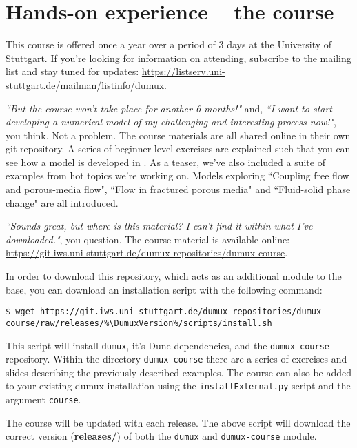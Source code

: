 \section{Hands-on \Dumux experience -- the \Dumux course}
This course is offered once a year over a period of 3 days at the University of Stuttgart.
If you're looking for information on attending, subscribe to the \Dumux mailing list
and stay tuned for updates:
\url{https://listserv.uni-stuttgart.de/mailman/listinfo/dumux}. \par
%
\textit{``But the course won't take place for another 6 months!"} and,
\textit{``I want to start developing a numerical model of my challenging and
  interesting process now!"}, you think.
Not a problem. The course materials are all shared online in their own
git repository. A series of beginner-level exercises are explained
such that you can see how a model is developed in \Dumux. As a teaser, we've
 also included a suite of examples from hot topics we're working on. Models
  exploring ``Coupling free flow and porous-media flow", ``Flow in fractured
   porous media" and ``Fluid-solid phase change" are all introduced.  \par
\textit{``Sounds great, but where is this material? I can't find it within
what I've downloaded."}, you question.
The \Dumux course material is available online:
\url{https://git.iws.uni-stuttgart.de/dumux-repositories/dumux-course}. \par
In order to download this repository, which acts as an additional module to
the \Dumux base, you can download an installation script with the following command:
\begin{lstlisting}[style=Bash,escapechar=\%]
$ wget https://git.iws.uni-stuttgart.de/dumux-repositories/dumux-course/raw/releases/%\DumuxVersion%/scripts/install.sh
\end{lstlisting}
This script will install \texttt{dumux}, it's Dune dependencies, and the \texttt{dumux-course}
repository. Within the directory \texttt{dumux-course} there are a series of exercises
and slides describing the previously described examples. The course can also be added to your existing 
dumux installation using the \texttt{installExternal.py} script and the argument \texttt{course}.\par
%
The \Dumux course will be updated with each \Dumux release.
The above script will download the correct version (\textbf{releases/\DumuxVersion}) of both
the \texttt{dumux} and \texttt{dumux-course} module.
